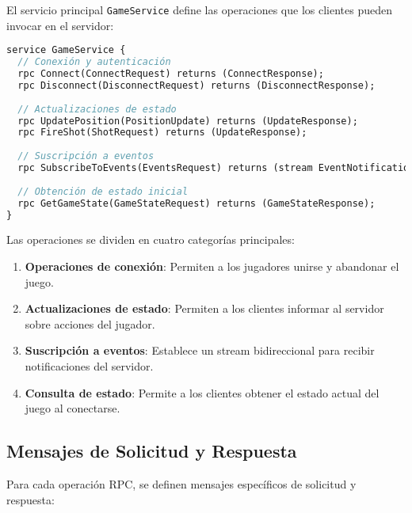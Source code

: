 \documentclass[12pt,letterpaper]{article}
\begin{document}
El servicio principal \texttt{GameService} define las operaciones que los clientes pueden invocar en el servidor:

\begin{lstlisting}[language=proto, caption=Definición del servicio GameService]
service GameService {
  // Conexión y autenticación
  rpc Connect(ConnectRequest) returns (ConnectResponse);
  rpc Disconnect(DisconnectRequest) returns (DisconnectResponse);
  
  // Actualizaciones de estado
  rpc UpdatePosition(PositionUpdate) returns (UpdateResponse);
  rpc FireShot(ShotRequest) returns (UpdateResponse);
  
  // Suscripción a eventos
  rpc SubscribeToEvents(EventsRequest) returns (stream EventNotification);
  
  // Obtención de estado inicial
  rpc GetGameState(GameStateRequest) returns (GameStateResponse);
}
\end{lstlisting}

Las operaciones se dividen en cuatro categorías principales:

\begin{enumerate}
    \item \textbf{Operaciones de conexión}: Permiten a los jugadores unirse y abandonar el juego.
    \item \textbf{Actualizaciones de estado}: Permiten a los clientes informar al servidor sobre acciones del jugador.
    \item \textbf{Suscripción a eventos}: Establece un stream bidireccional para recibir notificaciones del servidor.
    \item \textbf{Consulta de estado}: Permite a los clientes obtener el estado actual del juego al conectarse.
\end{enumerate}

\subsection{Mensajes de Solicitud y Respuesta}

Para cada operación RPC, se definen mensajes específicos de solicitud y respuesta:
\end{document}
